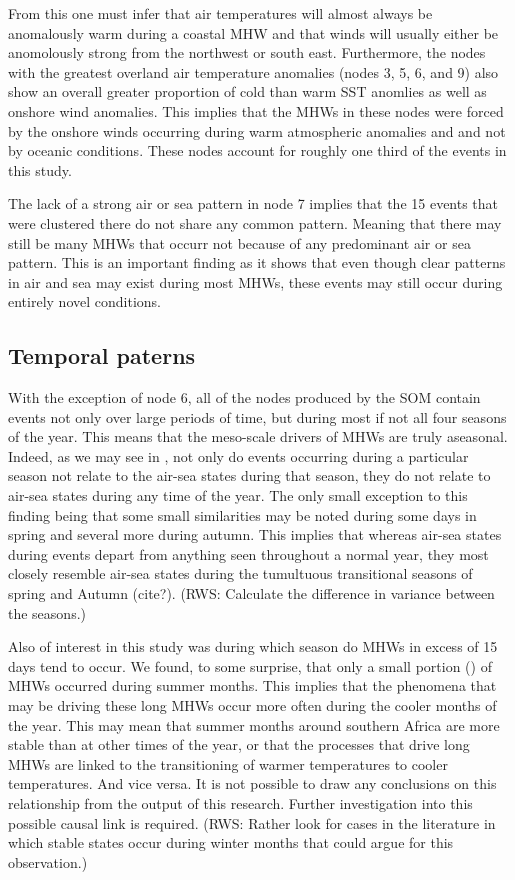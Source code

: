 \documentclass[a4paper,10pt,review]{elsarticle}
\begin{document}
From this one must infer that air temperatures will almost always be anomalously warm during a coastal MHW and that winds will usually either be anomolously strong from the northwest or south east. Furthermore, the nodes with the greatest overland air temperature anomalies (nodes 3, 5, 6, and 9) also show an overall greater proportion of cold than warm SST anomlies as well as onshore wind anomalies. This implies that the MHWs in these nodes were forced by the onshore winds occurring during warm atmospheric anomalies and and not by oceanic conditions. These nodes account for roughly one third of the events in this study.

The lack of a strong air or sea pattern in node 7 implies that the 15 events that were clustered there do not share any common pattern. Meaning that there may still be many MHWs that occurr not because of any predominant air or sea pattern. This is an important finding as it shows that even though clear patterns in air and sea may exist during most MHWs, these events may still occur during entirely novel conditions.

\subsection{Temporal paterns}
With the exception of node 6, all of the nodes produced by the SOM contain events not only over large periods of time, but during most if not all four seasons of the year. This means that the meso-scale drivers of MHWs are truly aseasonal. Indeed, as we may see in , not only do events occurring during a particular season not relate to the air-sea states during that season, they do not relate to air-sea states during any time of the year. The only small exception to this finding being that some small similarities may be noted during some days in spring and several more during autumn. This implies that whereas air-sea states during events depart from anything seen throughout a normal year, they most closely resemble air-sea states during the tumultuous transitional seasons of spring and Autumn (cite?). (RWS: Calculate the difference in variance between the seasons.)

Also of interest in this study was during which season do MHWs in excess of 15 days tend to occur. We found, to some surprise, that only a small portion () of MHWs occurred during summer months. This implies that the phenomena that may be driving these long MHWs occur more often during the cooler months of the year. This may mean that summer months around southern Africa are more stable than at other times of the year, or that the processes that drive long MHWs are linked to the transitioning of warmer temperatures to cooler temperatures. And vice versa. It is not possible to draw any conclusions on this relationship from the output of this research. Further investigation into this possible causal link is required. (RWS: Rather look for cases in the literature in which stable states occur during winter months that could argue for this observation.)
\end{document}
